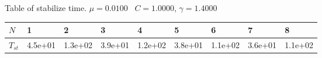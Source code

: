 \begin{center}
Table of stabilize time. $\mu = 0.0100$ \, $C = 1.0000$, $\gamma = 1.4000$
  
\begin{tabular}{|p{0.6in}|p{0.6in}|p{0.6in}|p{0.6in}|p{0.6in}|p{0.6in}|p{0.6in}|p{0.6in}|p{0.6in}|} \hline
$N$ &1 &2 &3 &4 &5 &6 &7 &8 \\ \hline 
$T_{st}$ &4.5e+01 &1.3e+02 &3.9e+01 &1.2e+02 &3.8e+01 &1.1e+02 &3.6e+01 &1.1e+02 \\ \hline 

\end{tabular}\\[20pt]
\end{center}
